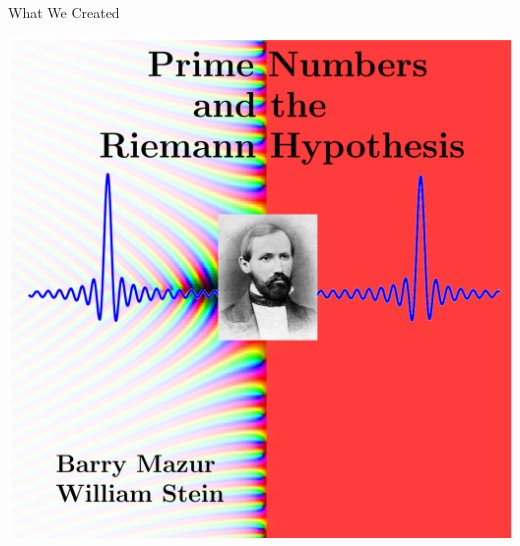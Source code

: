 \documentclass{beamer}
\begin{document}
\begin{frame}{What We Created}
  \begin{center}
    \includegraphics[height=.82\textheight]{pics/cover-we-wanted}
  \end{center}
\end{frame}
\end{document}
